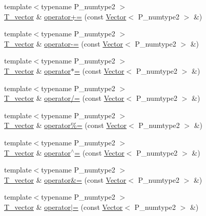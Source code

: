 \begin{DoxyCompactItemize}
\item 
{\footnotesize template$<$typename P\+\_\+numtype2 $>$ }\\\hyperlink{classVector_a29e279edfeac4d65aad0d814c05cfaf0}{T\+\_\+vector} \& \hyperlink{classVector_ae3cd2ed57d3e67f8dc48689f9812ae6b}{operator+=} (const \hyperlink{classVector}{Vector}$<$ P\+\_\+numtype2 $>$ \&)
\item 
{\footnotesize template$<$typename P\+\_\+numtype2 $>$ }\\\hyperlink{classVector_a29e279edfeac4d65aad0d814c05cfaf0}{T\+\_\+vector} \& \hyperlink{classVector_a086d0d168ba0984472c3d733335715df}{operator-\/=} (const \hyperlink{classVector}{Vector}$<$ P\+\_\+numtype2 $>$ \&)
\item 
{\footnotesize template$<$typename P\+\_\+numtype2 $>$ }\\\hyperlink{classVector_a29e279edfeac4d65aad0d814c05cfaf0}{T\+\_\+vector} \& \hyperlink{classVector_a701352be96a72c3e6daaa34a45061c3f}{operator$\ast$=} (const \hyperlink{classVector}{Vector}$<$ P\+\_\+numtype2 $>$ \&)
\item 
{\footnotesize template$<$typename P\+\_\+numtype2 $>$ }\\\hyperlink{classVector_a29e279edfeac4d65aad0d814c05cfaf0}{T\+\_\+vector} \& \hyperlink{classVector_a1c793a5e4e64cce8dcbd5f9d87f5793b}{operator/=} (const \hyperlink{classVector}{Vector}$<$ P\+\_\+numtype2 $>$ \&)
\item 
{\footnotesize template$<$typename P\+\_\+numtype2 $>$ }\\\hyperlink{classVector_a29e279edfeac4d65aad0d814c05cfaf0}{T\+\_\+vector} \& \hyperlink{classVector_af4c9958f08e68bd139a7839f38a9b5ab}{operator\%=} (const \hyperlink{classVector}{Vector}$<$ P\+\_\+numtype2 $>$ \&)
\item 
{\footnotesize template$<$typename P\+\_\+numtype2 $>$ }\\\hyperlink{classVector_a29e279edfeac4d65aad0d814c05cfaf0}{T\+\_\+vector} \& \hyperlink{classVector_a78f1ff61393c7da89a1804cdb5537ddc}{operator$^\wedge$=} (const \hyperlink{classVector}{Vector}$<$ P\+\_\+numtype2 $>$ \&)
\item 
{\footnotesize template$<$typename P\+\_\+numtype2 $>$ }\\\hyperlink{classVector_a29e279edfeac4d65aad0d814c05cfaf0}{T\+\_\+vector} \& \hyperlink{classVector_a5f5fd583f9a383ea9558bb2f081bf023}{operator\&=} (const \hyperlink{classVector}{Vector}$<$ P\+\_\+numtype2 $>$ \&)
\item 
{\footnotesize template$<$typename P\+\_\+numtype2 $>$ }\\\hyperlink{classVector_a29e279edfeac4d65aad0d814c05cfaf0}{T\+\_\+vector} \& \hyperlink{classVector_a47c6d756ac1c4615e4639bd2ae597593}{operator$\vert$=} (const \hyperlink{classVector}{Vector}$<$ P\+\_\+numtype2 $>$ \&)

\end{DoxyCompactItemize}
